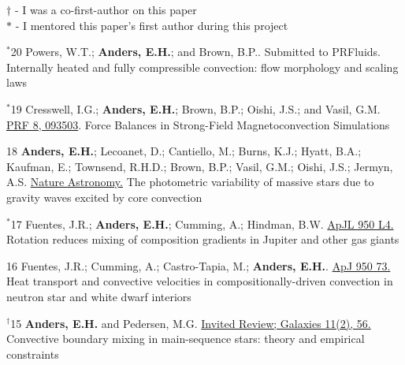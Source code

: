 {}
\hspace{\smallsephintwidth}$\dagger$ - I was a co-first-author on this paper \\
\hspace{\smallsephintwidth}$*$ - I mentored this paper's first author during this project
\vspace{0.3cm}


      {$^*$20}
      {
        Powers, W.T.; \textbf{Anders, E.H.}; and Brown, B.P..
        Submitted to PRFluids.\hspace{-0.5cm}
      }
      {Internally heated and fully compressible convection: flow morphology and scaling laws}

\cvpub{}
      {$^*$19}
      {
        Cresswell, I.G.; \textbf{Anders, E.H.}; Brown, B.P.; Oishi, J.S.; and Vasil, G.M.
        \href{https://journals.aps.org/prfluids/abstract/10.1103/PhysRevFluids.8.093503}{PRF 8, 093503}. 
      }
      {Force Balances in Strong-Field Magnetoconvection Simulations}

\cvpub{}
      {18}
      {
        \textbf{Anders, E.H.}; Lecoanet, D.; Cantiello, M.; Burns, K.J.; Hyatt, B.A.; Kaufman, E.; Townsend, R.H.D.; Brown, B.P.; Vasil, G.M.; Oishi, J.S.; Jermyn, A.S. 
        \href{https://www.nature.com/articles/s41550-023-02040-7}{Nature Astronomy.}
      }
      {The photometric variability of massive stars due to gravity waves excited by core convection}

\cvpub{}
      {$^*$17}
      { Fuentes, J.R.; \textbf{Anders, E.H.}; Cumming, A.; Hindman, B.W. 
        \href{https://iopscience.iop.org/article/10.3847/2041-8213/acd774}{ApJL 950 L4.}
      }
      {Rotation reduces mixing of composition gradients in Jupiter and other gas giants}

\cvpub{}
      {16}
      {
        Fuentes, J.R.; Cumming, A.; Castro-Tapia, M.; \textbf{Anders, E.H.}. 
        \href{https://iopscience.iop.org/article/10.3847/1538-4357/accb56}{ApJ 950 73.}
      }
      {Heat transport and convective velocities in compositionally-driven convection in neutron star and white dwarf interiors}

\cvpub{}
      {$^{\dagger}$15}
      {
        \textbf{Anders, E.H.} and Pedersen, M.G. 
        \href{https://www.mdpi.com/2075-4434/11/2/56}{Invited Review; Galaxies 11(2), 56.}
      }
      {Convective boundary mixing in main-sequence stars: theory and empirical constraints}

